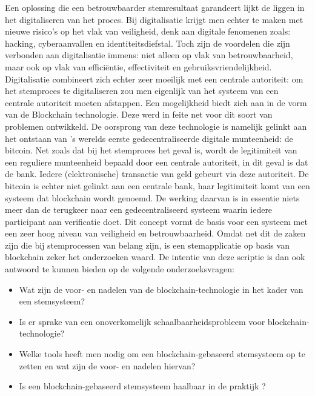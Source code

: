\linebreak{}
Een oplossing die een betrouwbaarder stemresultaat  garandeert lijkt de liggen in het digitaliseren van het proces. Bij digitalisatie krijgt men echter te maken met nieuwe risico's op het vlak van veiligheid, denk aan digitale fenomenen zoals: hacking, cyberaanvallen en identiteitsdiefstal. Toch zijn de voordelen die zijn verbonden aan digitalisatie immens: niet alleen op vlak van betrouwbaarheid, maar ook op vlak van efficiëntie, effectiviteit en gebruiksvriendelijkheid. Digitalisatie combineert zich echter zeer moeilijk met een centrale autoriteit: om het stemproces te digitaliseren zou men eigenlijk van het systeem van een centrale autoriteit moeten afstappen. 
\linebreak{}
Een mogelijkheid biedt zich aan in de vorm van de Blockchain technologie. Deze werd in feite net voor dit soort van problemen ontwikkeld. De oorsprong van deze technologie is namelijk gelinkt aan het ontstaan van 's werelds eerste gedecentraliseerde digitale munteenheid: de bitcoin. 
Net zoals dat bij het stemproces het geval is, wordt de legitimiteit van een reguliere munteenheid bepaald door een centrale autoriteit, in dit geval is dat de bank. Iedere (elektronische) transactie van geld gebeurt via deze autoriteit. De bitcoin is echter niet gelinkt aan een centrale bank, haar legitimiteit komt van een systeem dat blockchain wordt genoemd. De werking daarvan is in essentie niets meer dan de terugkeer naar een gedecentraliseerd systeem waarin iedere participant aan verificatie doet. 
\linebreak{}
Dit concept vormt de basis voor een systeem met een zeer hoog niveau van veiligheid en betrouwbaarheid. Omdat net dit de zaken zijn die bij stemprocessen van belang zijn, is een stemapplicatie op basis van blockchain zeker het onderzoeken waard.  De intentie van deze scriptie is dan ook antwoord te kunnen bieden op de volgende onderzoeksvragen:
\linebreak{}
\begin{itemize}
  \item Wat zijn de voor- en nadelen van de blockchain-technologie in het kader van een stemsysteem?
  \item Is er sprake van een onoverkomelijk schaalbaarheidsprobleem voor blockchain-technologie?
  \item Welke tools heeft men nodig om een blockchain-gebaseerd stemsysteem op te zetten en wat zijn de voor- en nadelen hiervan?
  \item Is een blockchain-gebaseerd stemsysteem haalbaar in de praktijk ?
\end{itemize}

